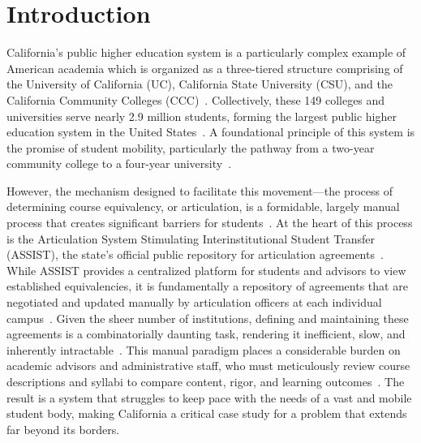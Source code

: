 \chapter{Introduction}

California's public higher education system is a particularly complex example of American academia which is organized as a three-tiered structure comprising of the University of California (UC), California State University (CSU), and the California Community Colleges (CCC)~\cite{ppic}. Collectively, these 149 colleges and universities serve nearly 2.9 million students, forming the largest public higher education system in the United States~\cite{ppic,uc,calstate,cccco}. A foundational principle of this system is the promise of student mobility, particularly the pathway from a two-year community college to a four-year university~\cite{ppic}.

However, the mechanism designed to facilitate this movement—the process of determining course equivalency, or articulation, is a formidable, largely manual process that creates significant barriers for students~\cite{pardos10.1145/3330430.3333622}. At the heart of this process is the Articulation System Stimulating Interinstitutional Student Transfer (ASSIST), the state's official public repository for articulation agreements~\cite{assistinfo}. While ASSIST provides a centralized platform for students and advisors to view established equivalencies, it is fundamentally a repository of agreements that are negotiated and updated manually by articulation officers at each individual campus~\cite{assistfaq}. Given the sheer number of institutions, defining and maintaining these agreements is a combinatorially daunting task, rendering it inefficient, slow, and inherently intractable~\cite{pardos10.1145/3330430.3333622}. This manual paradigm places a considerable burden on academic advisors and administrative staff, who must meticulously review course descriptions and syllabi to compare content, rigor, and learning outcomes~\cite{pardos10.1145/3330430.3333622}. The result is a system that struggles to keep pace with the needs of a vast and mobile student body, making California a critical case study for a problem that extends far beyond its borders.

